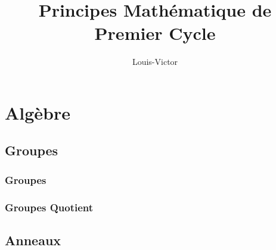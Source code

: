 \documentclass{book}
\title{Principes Mathématique de Premier Cycle}
\author{Louis-Victor}
\theoremstyle{plain}
\theoremstyle{definition}
\begin{document}
\maketitle
\date{}
\tableofcontents
\newpage
\part{Algèbre}
\chapter{Groupes}
\label{ch:group}

\section{Groupes}
\label{sec:group-group}
\section{Groupes Quotient}
\label{sec:group-quotients}

\label{part:alg}
\chapter{Anneaux}

\end{document}
